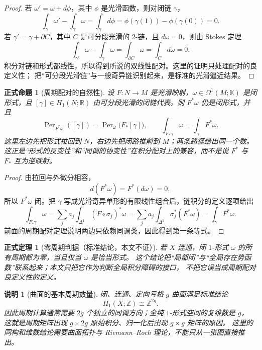 \documentclass[UTF8,fontset=none,a4paper,11pt]{ctexart}
\theoremstyle{foundation-definition}
\theoremstyle{foundation-theorem}
\newtheorem{theorem}[definition]{正式定理}
\theoremstyle{foundation-proposition}
\newtheorem{proposition}[definition]{正式命题}
\theoremstyle{foundation-example}
\theoremstyle{foundation-remark}
\newtheorem{remark}[definition]{说明}
\theoremstyle{foundation-theorem}
\begin{document}
\begin{proof}
若 \(\omega'=\omega+d\phi\)，其中 \(\phi\) 是光滑函数，则对闭链 \(\gamma\)，
\[
\int_\gamma\omega'-\int_\gamma\omega
=\int_\gamma d\phi
=\phi(\gamma(1))-\phi(\gamma(0))=0.
\]
若 \(\gamma'=\gamma+\partial C\)，其中 \(C\) 是可分段光滑的 \(2\)-链，且
\(d\omega=0\)，则由 Stokes 定理
\[
\int_{\gamma'}\omega-\int_\gamma\omega
=\int_{\partial C}\omega
=\int_Cd\omega=0.
\]
积分对链和形式都线性，所以得到所说的双线性配对。这里的证明只处理配对的良定义性；
把“可分段光滑链”与一般奇异链识别起来，是标准的光滑逼近结果。
\end{proof}

\begin{proposition}[周期配对的自然性]\label{prop:period-naturality}
设 \(F:N\to M\) 是光滑映射，\(\omega\in\Omega^1(M;\mathbb K)\) 是闭形式，且
\([\gamma]\in H_1(N;\mathbb R)\) 由可分段光滑的闭链代表。则 \(F^*\omega\) 仍是闭形式，并且
\[
\operatorname{Per}_{F^*\omega}([\gamma])
=\operatorname{Per}_{\omega}\bigl(F_*[\gamma]\bigr),
\qquad
\int_{F_*\gamma}\omega=\int_\gamma F^*\omega.
\]
这里左边先把形式拉回到 \(N\)，右边先把闭路推前到 \(M\)；两条路径给出同一个数。
这正是“形式的反变性”和“同调的协变性”在积分配对上的兼容，而不是说 \(F^*\) 与 \(F_*\)
互为逆映射。
\end{proposition}

\begin{proof}
由拉回与外微分相容，
\[
d(F^*\omega)=F^*(d\omega)=0,
\]
所以 \(F^*\omega\) 闭。把 \(\gamma\) 写成光滑奇异单形的有限线性组合后，链积分的定义逐项给出
\[
\int_{F_*\gamma}\omega
=\sum_j a_j\int_{\Delta^1}(F\circ\sigma_j)^*\omega
=\sum_j a_j\int_{\Delta^1}\sigma_j^*(F^*\omega)
=\int_\gamma F^*\omega.
\]
前面的周期配对定理说明两边只依赖同调类，因此得到第一条等式。
\end{proof}

\begin{theorem}[零周期判据（标准结论，本文不证）]
若 \(X\) 连通，闭 \(1\)-形式 \(\omega\) 的所有周期都为零，当且仅当 \(\omega\) 是恰当形式。
这个结论把“局部闭”与“全局存在势函数”联系起来；本文只把它作为判断全局积分障碍的接口，
不把它误当成周期配对良定义性的定义。
\end{theorem}

\begin{remark}[曲面的基本周期数量]
闭、连通、定向亏格 \(g\) 曲面满足标准结论
\[
H_1(X;\mathbb Z)\cong\mathbb Z^{2g}.
\]
因此周期计算通常需要 \(2g\) 个独立的同调方向；全纯 \(1\)-形式空间的复维数是 \(g\)，
这就是周期矩阵出现 \(g\times 2g\) 原始积分、归一化后出现 \(g\times g\) 矩阵的原因。
这里的同构和维数结论需要曲面拓扑与 Riemann--Roch 理论，不能只从一张图直接推出。
\end{remark}
\end{document}
